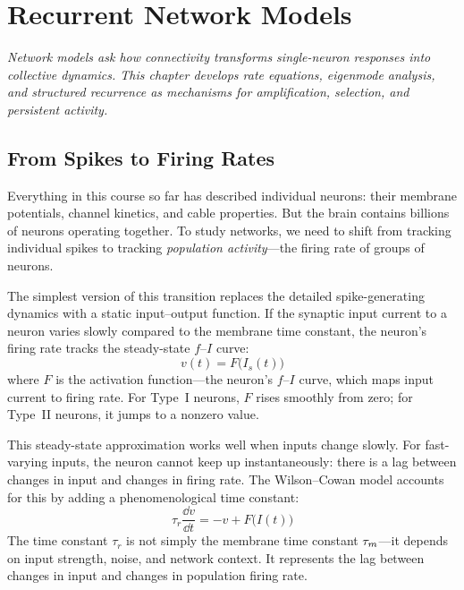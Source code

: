 \chapter{Recurrent Network Models}
\label{ch:networks}

\textit{Network models ask how connectivity transforms single-neuron responses into collective dynamics. This chapter develops rate equations, eigenmode analysis, and structured recurrence as mechanisms for amplification, selection, and persistent activity.}

\section{From Spikes to Firing Rates}
\label{sec:spikes-to-rates}

Everything in this course so far has described individual neurons: their membrane potentials, channel kinetics, and cable properties. But the brain contains billions of neurons operating together. To study networks, we need to shift from tracking individual spikes to tracking \emph{population activity}---the firing rate of groups of neurons.

The simplest version of this transition replaces the detailed spike-generating dynamics with a static input--output function. If the synaptic input current to a neuron varies slowly compared to the membrane time constant, the neuron's firing rate tracks the steady-state $f$--$I$ curve:
%
\begin{equation}
  v(t) = F\bigl(I_s(t)\bigr)
  \label{eq:static-rate}
\end{equation}
%
where $F$ is the activation function---the neuron's $f$--$I$ curve, which maps input current to firing rate. For Type~I neurons, $F$ rises smoothly from zero; for Type~II neurons, it jumps to a nonzero value.

This steady-state approximation works well when inputs change slowly. For fast-varying inputs, the neuron cannot keep up instantaneously: there is a lag between changes in input and changes in firing rate. The Wilson--Cowan model accounts for this by adding a phenomenological time constant:
%
\begin{equation}
  \tau_r \frac{\dd v}{\dd t} = -v + F\bigl(I(t)\bigr)
  \label{eq:wilson-cowan}
\end{equation}
%
The time constant $\tau_r$ is not simply the membrane time constant $\tau_m$---it depends on input strength, noise, and network context. It represents the lag between changes in input and changes in population firing rate.

